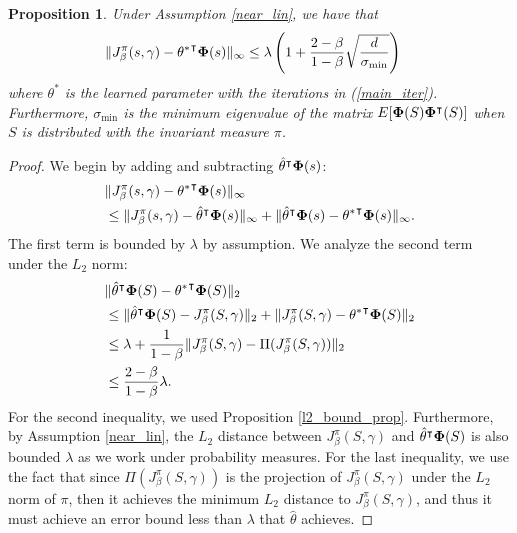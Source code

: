 \documentclass[11pt]{article}
\newtheorem{prop}{Proposition}
\begin{document}
\begin{prop}\label{uni_bound}
Under Assumption \ref{near_lin}, we have that 
\begin{align*}
&\|J_\beta^\pi(s,\gamma) - {\theta^*}^\intercal {\bf \Phi}(s)\|_\infty \leq \lambda \left(1+  \frac{2-\beta}{1-\beta}\sqrt{\frac{d}{\sigma_{\min}}}\right)
\end{align*}
where $\theta^*$ is the learned parameter with the iterations in (\ref{main_iter}). Furthermore,  $\sigma_{\min}$ is the minimum eigenvalue of the matrix $E[{\bf \Phi}(S) {\bf \Phi}^\intercal(S)  ] $ when $S$ is distributed with the invariant measure $\pi$.
\end{prop}
\begin{proof}
We begin by adding and subtracting $\hat{\theta}^\intercal {\bf \Phi}(s)$:
\begin{align*}
&\|J_\beta^\pi(s,\gamma) - {\theta^*}^\intercal {\bf \Phi}(s)\|_\infty\\
& \leq \| J_\beta^\pi(s,\gamma) - \hat{\theta}^\intercal {\bf \Phi}(s)\|_\infty+ \| \hat{\theta}^\intercal {\bf \Phi}(s) -  {\theta^*}^\intercal {\bf \Phi}(s)\|_\infty.
\end{align*}
The first term is bounded by $\lambda$ by assumption. We analyze the second term under the $L_2$ norm:
\begin{align*}
 &\| \hat{\theta}^\intercal {\bf \Phi}(S) -  {\theta^*}^\intercal {\bf \Phi}(S)\|_2 \\
 &\leq   \| \hat{\theta}^\intercal {\bf \Phi}(S) - J_\beta^\pi(S,\gamma)\|_2 + \|J_\beta^\pi(S,\gamma) - {\theta^*}^\intercal {\bf \Phi}(S)\|_2\\
 &\leq \lambda + \frac{1}{1-\beta}   \|J_\beta^\pi(S,\gamma) - \Pi (J_\beta^\pi(S,\gamma) ) \|_2\\
 &\leq \frac{2-\beta}{1-\beta}\lambda.
\end{align*}
For the second inequality, we used Proposition \ref{l2_bound_prop}. Furthermore, by Assumption \ref{near_lin}, the $L_2$ distance between $J_\beta^\pi(S,\gamma)$ and  $\hat{\theta}^\intercal {\bf \Phi}(S)$ is also bounded $\lambda$ as we work under probability measures. For the last inequality,  we use the fact that since $ \Pi (J_\beta^\pi(S,\gamma) ) $ is the projection of  $J_\beta^\pi(S,\gamma)$ under the $L_2$ norm of $\pi$, then it achieves the minimum $L_2$ distance to $J_\beta^\pi(S,\gamma)$, and thus it must achieve an error bound less than $\lambda$ that $\hat{\theta}$ achieves. 


\end{proof}
\end{document}
